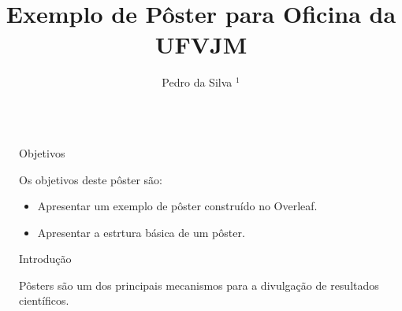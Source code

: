 \documentclass[final]{beamer}
\title{Exemplo de Pôster para Oficina da UFVJM} %
\author{Pedro da Silva $^{1}$} %
\institute{$^{1}$ Universidade Federal dos Vales do Jequitinhonha e Mucuri} %
\newlength{\sepwid}
\newlength{\onecolwid}
\begin{document}

\setlength{\belowcaptionskip}{2ex} %
\setlength\belowdisplayshortskip{2ex} %

\begin{frame}[t] %

\begin{columns}[t] %

\begin{column}{\sepwid}\end{column} %

\begin{column}{\onecolwid} %



\begin{alertblock}{Objetivos}
{\Large
Os objetivos deste pôster são:
\begin{itemize}
\item Apresentar um exemplo de pôster construído no Overleaf.
\item Apresentar a estrtura básica de um pôster.
\end{itemize}
}
\end{alertblock}


\begin{block}{Introdução}

{\Large

Pôsters são um dos principais mecanismos para a divulgação de resultados científicos. \\

}
\end{block}
\end{column}
\end{columns}
\end{frame}
\end{document}
